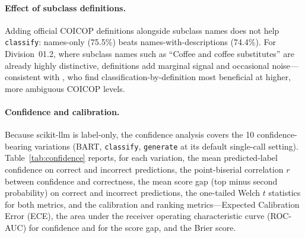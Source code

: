 \documentclass[11pt,a4paper]{article}
\begin{document}
\paragraph{Effect of subclass definitions.}
Adding official COICOP definitions alongside subclass names does not help
\texttt{classify}: names-only (75.5\%) beats names-with-descriptions (74.4\%).
For Division~01.2, where subclass names such as ``Coffee and coffee
substitutes'' are already highly distinctive, definitions add marginal signal
and occasional noise---consistent with \citet{nunes2025rac}, who find
classification-by-definition most beneficial at higher, more ambiguous COICOP
levels.

\paragraph{Confidence and calibration.}
Because scikit-llm is label-only, the confidence analysis covers the 10
confidence-bearing variations (BART, \texttt{classify}, \texttt{generate} at
its default single-call setting).
Table~\ref{tab:confidence} reports, for each variation, the mean predicted-label
confidence on correct and incorrect predictions, the point-biserial
correlation $r$ between confidence and correctness, the mean score gap (top
minus second probability) on correct and incorrect predictions, the one-tailed
Welch $t$ statistics for both metrics, and the calibration and ranking
metrics---Expected Calibration Error (ECE), the area under the receiver
operating characteristic curve (ROC-AUC) for confidence and for the score gap,
and the Brier score.
\end{document}
